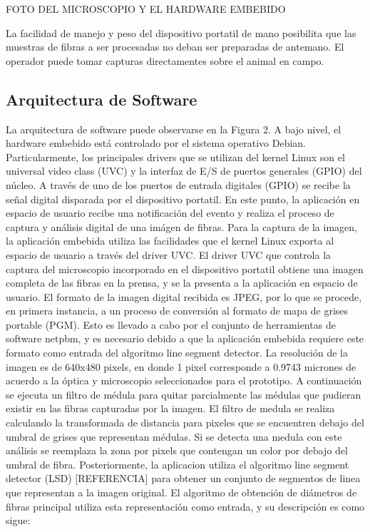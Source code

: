 \documentclass[runningheads,a4paper]{llncs}
\begin{document}
FOTO DEL MICROSCOPIO Y EL HARDWARE EMBEBIDO

La facilidad de manejo y peso del dispositivo portatil de mano posibilita que las muestras de fibras a ser procesadas no deban ser preparadas de antemano. El operador puede tomar capturas directamentes sobre el animal en campo.


\subsection{Arquitectura de Software}


La arquitectura de software puede observarse en la Figura 2.
A bajo nivel, el hardware embebido está controlado por el sistema operativo Debian. Particularmente, los principales drivers que se utilizan del kernel Linux son el universal video class (UVC) y la interfaz de E/S de puertos generales (GPIO) del núcleo.
A través de uno de los puertos de entrada digitales (GPIO) se recibe la señal digital disparada por el dispositivo portatil. En este punto, la aplicación en espacio de usuario recibe una notificación del evento y realiza el proceso de captura y análisis digital de una imágen de fibras.
Para la captura de la imagen, la aplicación embebida utiliza las facilidades que el kernel Linux exporta al espacio de usuario a través del driver UVC. El driver UVC que controla la captura del microscopio incorporado en el dispositivo portatil obtiene una imagen completa de las fibras en la prensa, y se la presenta a la aplicación en espacio de usuario.
El formato de la imagen digital recibida es JPEG, por lo que se procede, en primera instancia, a un proceso de conversión al formato de mapa de grises portable (PGM). Esto es llevado a cabo por el conjunto de herramientas de software netpbm, y es necesario debido a que la aplicación embebida requiere este formato como entrada del algoritmo line segment detector.
La resolución de la imagen es de 640x480 pixels, en donde 1 pixel corresponde a 0.9743 micrones de acuerdo a la óptica y microscopio seleccionados para el prototipo.
A continuación se ejecuta un filtro de médula para quitar parcialmente las médulas que pudieran existir en las fibras capturadas por la imagen. El filtro de medula se realiza calculando la transformada de distancia para pixeles que se encuentren debajo del umbral de grises que representan médulas. Si se detecta una medula con este análisis se reemplaza la zona por pixels que contengan un color por debajo del umbral de fibra.
Posteriormente, la aplicacion utiliza el algoritmo line segment detector (LSD) [REFERENCIA] para obtener un conjunto de segmentos de linea que representan a la imagen original. El algoritmo de obtención de diámetros de fibras principal utiliza esta representación como entrada, y su descripción es como sigue:
\end{document}
